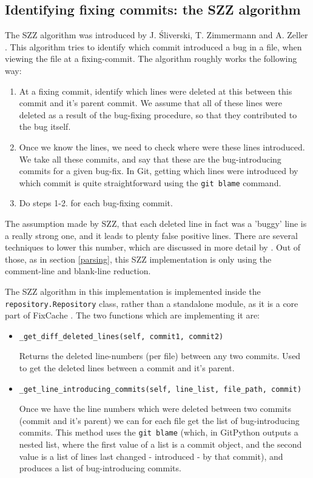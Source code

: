 \documentclass[12pt,twoside,notitlepage]{report}
\newcommand{\fxch}{FixCache }
\begin{document}
\subsection{Identifying fixing commits: the SZZ algorithm}
The SZZ algorithm was introduced by J. \'Sliverski, T. Zimmermann and A. Zeller \cite{SZZ}. This algorithm tries to identify which commit introduced a bug in a file, when viewing the file at a fixing-commit. The algorithm roughly works the following way:
\begin{enumerate}
\item At a fixing commit, identify which lines were deleted at this between this commit and it's parent commit. We assume that all of these lines were deleted as a result of the bug-fixing procedure, so that they contributed to the bug itself.
\item Once we know the lines, we need to check where were these lines introduced. We take all these commits, and say that these are the bug-introducing commits for a given bug-fix. In Git, getting which lines were introduced by which commit is quite straightforward using the \texttt{git blame} command.
\item Do steps 1-2. for each bug-fixing commit.
\end{enumerate}
The assumption made by SZZ, that each deleted line in fact was a 'buggy' line is a really strong one, and it leads to plenty false positive lines. There are several techniques to lower this number, which are discussed in more detail by \cite{KimZim}. Out of those, as in section \ref{parsing}, this SZZ implementation is only using the comment-line and blank-line reduction.

The SZZ algorithm in this implementation is implemented inside the \texttt{repository.Repository} class, rather than a standalone module, as it is a core part of \fxch. The two functions which are implementing it are:
\begin{itemize}
\item \texttt{\_get\_diff\_deleted\_lines(self, commit1, commit2)}

Returns the deleted line-numbers (per file) between any two commits. Used to get the deleted lines between a commit and it's parent.
\item \texttt{\_get\_line\_introducing\_commits(self, line\_list, file\_path, commit)}

Once we have the line numbers which were deleted between two commits (commit and it's parent) we can for each file get the list of bug-introducing commits. This method uses the \texttt{git blame} (which, in GitPython outputs a nested list, where the first value of a list is a commit object, and the second value is a list of lines last changed - introduced - by that commit), and produces a list of bug-introducing commits.
\end{itemize}
\end{document}
